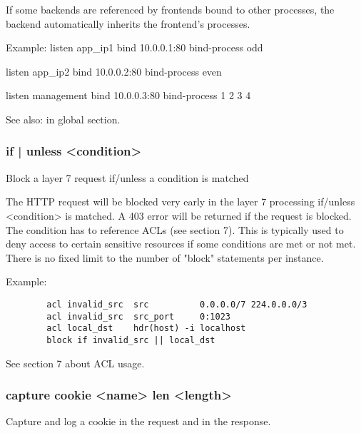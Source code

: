   If some backends are referenced by frontends bound to other processes, the
  backend automatically inherits the frontend's processes.

  \begin{example}{Example:}
        listen app_ip1
            bind 10.0.0.1:80
            bind-process odd

        listen app_ip2
            bind 10.0.0.2:80
            bind-process even

        listen management
            bind 10.0.0.3:80
            bind-process 1 2 3 4
  \end{example}

  See also:  in global section.

\subsubsection[block]{ { if | unless } <condition>}
  Block a layer 7 request if/unless a condition is matched


  The HTTP request will be blocked very early in the layer 7 processing
  if/unless <condition> is matched. A 403 error will be returned if the request
  is blocked. The condition has to reference ACLs (see section 7). This is
  typically used to deny access to certain sensitive resources if some
  conditions are met or not met. There is no fixed limit to the number of
  "block" statements per instance.

  Example:
  \begin{verbatim}
        acl invalid_src  src          0.0.0.0/7 224.0.0.0/3
        acl invalid_src  src_port     0:1023
        acl local_dst    hdr(host) -i localhost
        block if invalid_src || local_dst
  \end{verbatim}

  See section 7 about ACL usage.

\subsubsection[capture cookie]{capture cookie <name> len <length>}
  Capture and log a cookie in the request and in the response.

                                  
